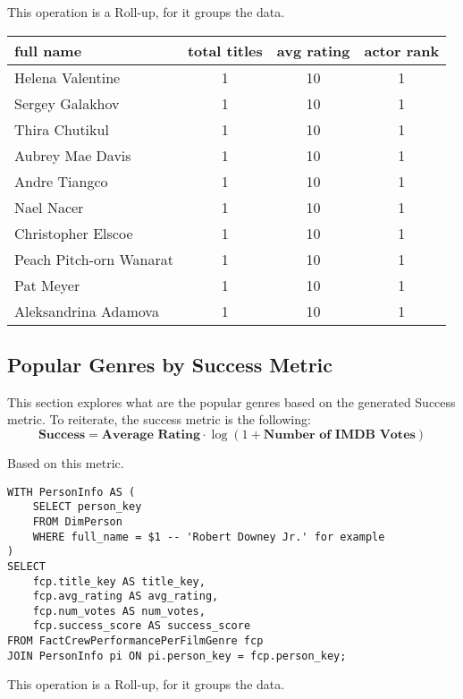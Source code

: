 \documentclass[sigconf, pbalance]{acmart}
\begin{document}
This operation is a Roll-up, for it groups the data.

\begin{center}
\begin{tabular}{|p{5cm}|c|c|c|}
\hline
full name & total titles & avg rating & actor rank\\
\hline
Helena Valentine & 1 & 10 & 1\\
Sergey Galakhov & 1 & 10 & 1\\
Thira Chutikul & 1 & 10 & 1\\
Aubrey Mae Davis & 1 & 10 & 1\\
Andre Tiangco & 1 & 10 & 1\\
Nael Nacer & 1 & 10 & 1\\
Christopher Elscoe & 1 & 10 & 1\\
Peach Pitch-orn Wanarat & 1 & 10 & 1\\
Pat Meyer & 1 & 10 & 1\\
Aleksandrina Adamova & 1 & 10 & 1\\
\hline
\end{tabular}
\end{center}

\subsection{Popular Genres by Success Metric}

This section explores what are the popular genres based on the generated Success metric. To reiterate, the success metric is the following:
$$
\textbf{Success} = \textbf{Average Rating} \cdot \log(1 + \textbf{Number of IMDB Votes})
$$

Based on this metric.


\begin{lstlisting}[style=SQLStyle]
WITH PersonInfo AS (
    SELECT person_key
    FROM DimPerson
    WHERE full_name = $1 -- 'Robert Downey Jr.' for example 
)
SELECT
    fcp.title_key AS title_key,
    fcp.avg_rating AS avg_rating,
    fcp.num_votes AS num_votes,
    fcp.success_score AS success_score
FROM FactCrewPerformancePerFilmGenre fcp
JOIN PersonInfo pi ON pi.person_key = fcp.person_key;
\end{lstlisting}

This operation is a Roll-up, for it groups the data.
\end{document}
